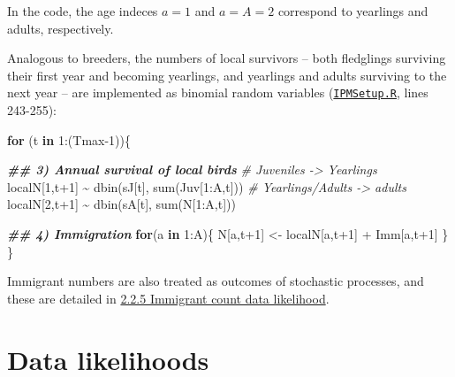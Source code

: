 \documentclass[
]{book}
\newenvironment{Shaded}{\begin{snugshade}}{\end{snugshade}}
\newcommand{\CommentTok}[1]{\textcolor[rgb]{0.56,0.35,0.01}{\textit{#1}}}
\newcommand{\ControlFlowTok}[1]{\textcolor[rgb]{0.13,0.29,0.53}{\textbf{#1}}}
\newcommand{\DecValTok}[1]{\textcolor[rgb]{0.00,0.00,0.81}{#1}}
\newcommand{\DocumentationTok}[1]{\textcolor[rgb]{0.56,0.35,0.01}{\textbf{\textit{#1}}}}
\newcommand{\FunctionTok}[1]{\textcolor[rgb]{0.00,0.00,0.00}{#1}}
\newcommand{\NormalTok}[1]{#1}
\newcommand{\OtherTok}[1]{\textcolor[rgb]{0.56,0.35,0.01}{#1}}
\newcommand{\SpecialCharTok}[1]{\textcolor[rgb]{0.00,0.00,0.00}{#1}}
\begin{document}
In the code, the age indeces \(a=1\) and \(a=A=2\) correspond to yearlings and
adults, respectively.

Analogous to breeders, the numbers of local survivors -- both fledglings surviving their
first year and becoming yearlings, and yearlings and adults surviving to the
next year -- are implemented as binomial random variables (\href{https://github.com/SPI-Birds/SPI-IPM/blob/main/SPI-IPM_Code/02-04_IPM_Setup\&Run/IPMSetup.R}{\texttt{IPMSetup.R}}, lines 243-255):

\begin{Shaded}
\begin{Highlighting}[]
\ControlFlowTok{for}\NormalTok{ (t }\ControlFlowTok{in} \DecValTok{1}\SpecialCharTok{:}\NormalTok{(Tmax}\DecValTok{{-}1}\NormalTok{))\{}
  
  \DocumentationTok{\#\# 3) Annual survival of local birds}
  \CommentTok{\# Juveniles {-}\textgreater{} Yearlings}
\NormalTok{  localN[}\DecValTok{1}\NormalTok{,t}\SpecialCharTok{+}\DecValTok{1}\NormalTok{] }\SpecialCharTok{\textasciitilde{}} \FunctionTok{dbin}\NormalTok{(sJ[t], }\FunctionTok{sum}\NormalTok{(Juv[}\DecValTok{1}\SpecialCharTok{:}\NormalTok{A,t]))}
  \CommentTok{\# Yearlings/Adults {-}\textgreater{} adults}
\NormalTok{  localN[}\DecValTok{2}\NormalTok{,t}\SpecialCharTok{+}\DecValTok{1}\NormalTok{] }\SpecialCharTok{\textasciitilde{}} \FunctionTok{dbin}\NormalTok{(sA[t], }\FunctionTok{sum}\NormalTok{(N[}\DecValTok{1}\SpecialCharTok{:}\NormalTok{A,t]))}
  
  \DocumentationTok{\#\# 4) Immigration}
  \ControlFlowTok{for}\NormalTok{(a }\ControlFlowTok{in} \DecValTok{1}\SpecialCharTok{:}\NormalTok{A)\{}
\NormalTok{    N[a,t}\SpecialCharTok{+}\DecValTok{1}\NormalTok{] }\OtherTok{\textless{}{-}}\NormalTok{ localN[a,t}\SpecialCharTok{+}\DecValTok{1}\NormalTok{] }\SpecialCharTok{+}\NormalTok{ Imm[a,t}\SpecialCharTok{+}\DecValTok{1}\NormalTok{]}
\NormalTok{  \}}
\NormalTok{\}}
\end{Highlighting}
\end{Shaded}

Immigrant numbers are also treated as outcomes of stochastic processes, and
these are detailed in \protect\hyperlink{ux5cux23ux5cux23ux5cux2520Immigrantux5cux2520countux5cux2520dataux5cux2520likelihood}{2.2.5 Immigrant count data likelihood}.

\hypertarget{data-likelihoods}{%
\section{Data likelihoods}\label{data-likelihoods}}
\end{document}
